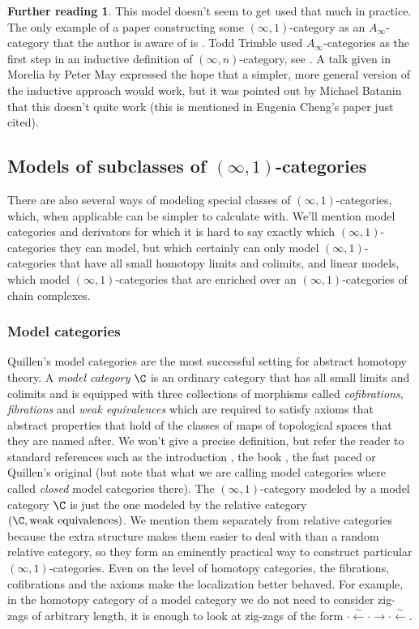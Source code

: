\documentclass[12pt]{amsart}
\theoremstyle{definition} \newtheorem{definition}[theorem]{Definition}
\newtheorem*{further}{Further reading}
\numberwithin{equation}{section}
\newcommand{\oo}{\infty}
\newcommand{\io}{$(\oo,1)$}
\begin{document}
\begin{further}
  This model doesn't seem to get used that much in practice. The only
  example of a paper constructing some \io-category as an
  $A_\oo$-category that the author is aware of is \cite[Proposition
  1.4]{Ching}. Todd Trimble used $A_\oo$-categories as the first step
  in an inductive definition of $(\oo,n)$-category, see
  \cite{ChengOperadic}. A talk given in Morelia by Peter May
  \cite{MayMorelia} expressed the hope that a simpler, more general
  version of the inductive approach would work, but it was pointed out
  by Michael Batanin that this doesn't quite work (this is mentioned
  in Eugenia Cheng's paper just cited).
\end{further}

\subsection{Models of subclasses of \io-categories}

There are also several ways of modeling special classes of
\io-categories, which, when applicable can be simpler to calculate
with. We'll mention model categories and derivators for which it is
hard to say exactly which \io-categories they can model, but which
certainly can only model \io-categories that have all small homotopy
limits and colimits, and linear models, which model \io-categories
that are enriched over an \io-categories of chain complexes.

\subsubsection{Model categories}

Quillen's model categories are the most successful setting for
abstract homotopy theory. A \emph{model category} $\C$ is an ordinary
category that has all small limits and colimits and is equipped with
three collections of morphisms called \emph{cofibrations},
\emph{fibrations} and \emph{weak equivalences} which are required to
satisfy axioms that abstract properties that hold of the classes of
maps of topological spaces that they are named after. We won't give a
precise definition, but refer the reader to standard references such
as the introduction \cite{DwyerSpalinski}, the book \cite{Hovey}, the
fast paced \cite[Appendix A.2]{HTT} or Quillen's original
\cite{Quillen} (but note that what we are calling model categories
where called \emph{closed} model categories there). The \io-category
modeled by a model category $\C$ is just the one modeled by the
relative category $(\C, \text{weak equivalences})$. We mention them
separately from relative categories because the extra structure makes
them easier to deal with than a random relative category, so they form
an eminently practical way to construct particular \io-categories.
Even on the level of homotopy categories, the fibrations, cofibrations
and the axioms make the localization better behaved. For example, in
the homotopy category of a model category we do not need to consider
zig-zags of arbitrary length, it is enough to look at zig-zags of the
form $\cdot \xleftarrow{\sim} \cdot \to \cdot \xleftarrow{\sim}$.
\end{document}
